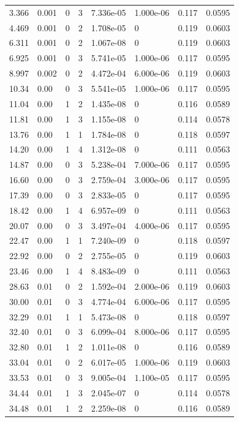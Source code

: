 \documentclass[preview]{standalone}
\begin{document}
{{\begin{tabular}{L{1.2cm}C{1.2cm} C{0.3cm}C{0.5cm} C{1.4cm}C{1.4cm} C{1.4cm}C{1.4cm}}
  3.366  &  0.001  & 0     &  3 &  7.336e-05  & 1.000e-06  & 0.117 &  0.0595   \\ 
  4.469  &  0.001  & 0     &  2 &  1.708e-05  & 0  & 0.119 &  0.0603   \\ 
  6.311  &  0.001  & 0     &  2 &  1.067e-08  & 0  & 0.119 &  0.0603   \\ 
  6.925  &  0.001  & 0     &  3 &  5.741e-05  & 1.000e-06  & 0.117 &  0.0595   \\ 
  8.997  &  0.002  & 0     &  2 &  4.472e-04  & 6.000e-06  & 0.119 &  0.0603   \\ 
  10.34  &  0.00  & 0     &  3 &  5.541e-05  & 1.000e-06  & 0.117 &  0.0595   \\ 
  11.04  &  0.00  & 1     &  2 &  1.435e-08  & 0  & 0.116 &  0.0589   \\ 
  11.81  &  0.00  & 1     &  3 &  1.155e-08  & 0  & 0.114 &  0.0578   \\ 
  13.76  &  0.00  & 1     &  1 &  1.784e-08  & 0  & 0.118 &  0.0597   \\ 
  14.20  &  0.00  & 1     &  4 &  1.312e-08  & 0  & 0.111 &  0.0563   \\ 
  14.87  &  0.00  & 0     &  3 &  5.238e-04  & 7.000e-06  & 0.117 &  0.0595   \\ 
  16.60  &  0.00  & 0     &  3 &  2.759e-04  & 3.000e-06  & 0.117 &  0.0595   \\ 
  17.39  &  0.00  & 0     &  3 &  2.833e-05  & 0  & 0.117 &  0.0595   \\ 
  18.42  &  0.00  & 1     &  4 &  6.957e-09  & 0  & 0.111 &  0.0563   \\ 
  20.07  &  0.00  & 0     &  3 &  3.497e-04  & 4.000e-06  & 0.117 &  0.0595   \\ 
  22.47  &  0.00  & 1     &  1 &  7.240e-09  & 0  & 0.118 &  0.0597   \\ 
  22.92  &  0.00  & 0     &  2 &  2.755e-05  & 0  & 0.119 &  0.0603   \\ 
  23.46  &  0.00  & 1     &  4 &  8.483e-09  & 0  & 0.111 &  0.0563   \\ 
  28.63  &  0.01  & 0     &  2 &  1.592e-04  & 2.000e-06  & 0.119 &  0.0603   \\ 
  30.00  &  0.01  & 0     &  3 &  4.774e-04  & 6.000e-06  & 0.117 &  0.0595   \\ 
  32.29  &  0.01  & 1     &  1 &  5.473e-08  & 0  & 0.118 &  0.0597   \\ 
  32.40  &  0.01  & 0     &  3 &  6.099e-04  & 8.000e-06  & 0.117 &  0.0595   \\ 
  32.80  &  0.01  & 1     &  2 &  1.011e-08  & 0  & 0.116 &  0.0589   \\ 
  33.04  &  0.01  & 0     &  2 &  6.017e-05  & 1.000e-06  & 0.119 &  0.0603   \\ 
  33.53  &  0.01  & 0     &  3 &  9.005e-04  & 1.100e-05  & 0.117 &  0.0595   \\ 
  34.44  &  0.01  & 1     &  3 &  2.045e-07  & 0  & 0.114 &  0.0578   \\ 
  34.48  &  0.01  & 1     &  2 &  2.259e-08  & 0  & 0.116 &  0.0589   \\ 
\hline 
\end{tabular} 

}}
\end{document}
